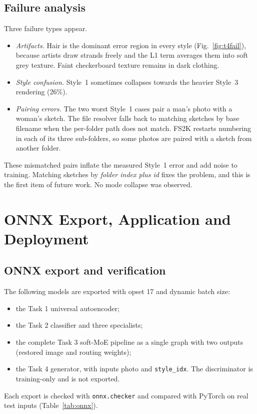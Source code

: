 \documentclass[conference]{IEEEtran}
\begin{document}
\subsection{Failure analysis}
Three failure types appear.
\begin{itemize}
\item \emph{Artifacts.} Hair is the dominant error region in every style (Fig.~\ref{fig:t4fail}), because artists draw strands freely and the L1 term averages them into soft grey texture. Faint checkerboard texture remains in dark clothing.
\item \emph{Style confusion.} Style~1 sometimes collapses towards the heavier Style~3 rendering (26\%).
\item \emph{Pairing errors.} The two worst Style~1 cases pair a man's photo with a woman's sketch. The file resolver falls back to matching sketches by base filename when the per-folder path does not match. FS2K restarts numbering in each of its three sub-folders, so some photos are paired with a sketch from another folder.
\end{itemize}
These mismatched pairs inflate the measured Style~1 error and add noise to training. Matching sketches by \emph{folder index plus id} fixes the problem, and this is the first item of future work. No mode collapse was observed.

\section{ONNX Export, Application and Deployment}\label{sec:app}
\subsection{ONNX export and verification}
The following models are exported with opset 17 and dynamic batch size:
\begin{itemize}
\item the Task 1 universal autoencoder;
\item the Task 2 classifier and three specialists;
\item the complete Task 3 soft-MoE pipeline as a single graph with two outputs (restored image and routing weights);
\item the Task 4 generator, with inputs photo and \texttt{style\_idx}. The discriminator is training-only and is not exported.
\end{itemize}
Each export is checked with \texttt{onnx.checker} and compared with PyTorch on real test inputs (Table~\ref{tab:onnx}).
\end{document}
